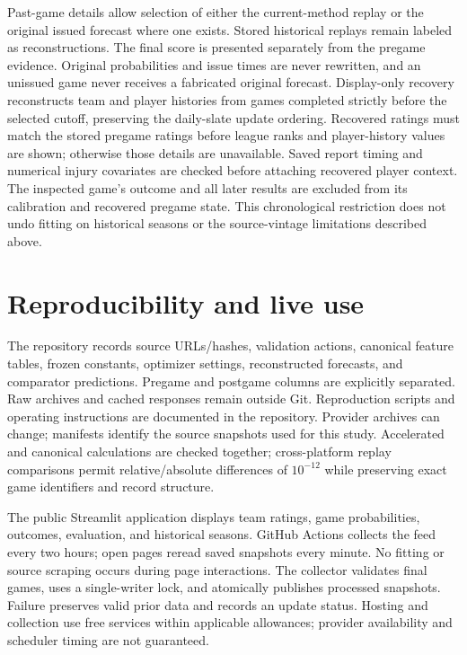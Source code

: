 \documentclass[11pt]{article}
\begin{document}
Past-game details allow selection of either the current-method replay or
the original issued forecast where one exists. Stored historical replays
remain labeled as reconstructions. The final score is presented separately
from the pregame evidence. Original probabilities and issue times are never
rewritten, and an unissued game never receives a fabricated original
forecast. Display-only recovery reconstructs team and player histories
from games completed strictly before the selected cutoff, preserving the
daily-slate update ordering. Recovered ratings must match the stored
pregame ratings before league ranks and player-history values are shown;
otherwise those details are unavailable. Saved report timing and numerical
injury covariates are checked before attaching recovered player context.
The inspected game's outcome and all later results are excluded from its
calibration and recovered pregame state. This chronological restriction
does not undo fitting on historical seasons or the source-vintage
limitations described above.

\section{Reproducibility and live use}
The repository records source URLs/hashes, validation actions, canonical
feature tables, frozen constants, optimizer settings, reconstructed forecasts,
and comparator predictions. Pregame and postgame columns are explicitly
separated. Raw archives and cached responses remain outside Git. Reproduction
scripts and operating instructions are documented in the repository.
Provider archives can change; manifests identify the source snapshots used
for this study. Accelerated and canonical calculations are checked together;
cross-platform replay comparisons permit relative/absolute differences of
$10^{-12}$ while preserving exact game identifiers and record structure.

The public Streamlit application displays team ratings, game probabilities,
outcomes, evaluation, and historical seasons. GitHub Actions collects the
feed every two hours; open pages reread saved snapshots every minute. No
fitting or source scraping occurs during page interactions. The collector
validates final games, uses a single-writer lock, and atomically publishes
processed snapshots. Failure preserves valid prior data and records an update
status. Hosting and collection use free services within applicable allowances;
provider availability and scheduler timing are not guaranteed.
\end{document}

